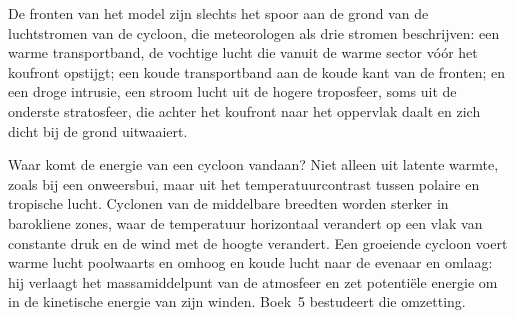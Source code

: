 \begin{omfigure}
\par{}
\end{omfigure}

De fronten van het model zijn slechts het spoor aan de grond van de luchtstromen van de cycloon, die
meteorologen als drie stromen beschrijven: een warme transportband, de vochtige lucht die vanuit de
warme sector vóór het koufront opstijgt; een koude transportband aan de koude kant van de fronten; en een
droge intrusie, een stroom lucht uit de hogere troposfeer, soms uit de onderste
stratosfeer, die achter het koufront naar het oppervlak daalt en zich dicht bij de
grond uitwaaiert.

Waar komt de energie van een cycloon vandaan? Niet alleen uit latente warmte, zoals bij een onweersbui,
maar uit het temperatuurcontrast tussen polaire en tropische lucht. Cyclonen van de middelbare breedten
worden sterker in barokliene zones, waar de temperatuur horizontaal verandert op een vlak van
constante druk en de wind met de hoogte verandert. Een groeiende cycloon voert warme lucht poolwaarts
en omhoog en koude lucht naar de evenaar en omlaag: hij verlaagt het massamiddelpunt van de
atmosfeer en zet potentiële energie om in de kinetische energie van zijn winden. Boek~5
bestudeert die omzetting.

